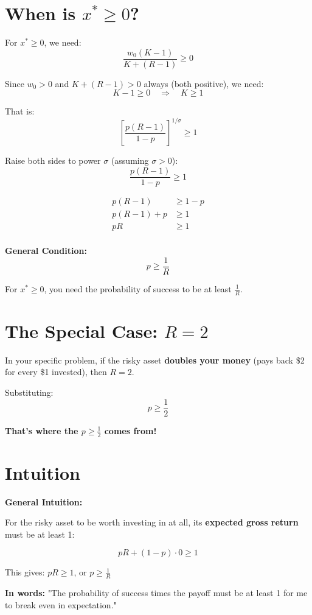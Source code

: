 \documentclass[12pt]{article}
\begin{document}
\section*{When is $x^* \geq 0$?}

For $x^* \geq 0$, we need:
\[
\frac{w_0(K - 1)}{K + (R-1)} \geq 0
\]

Since $w_0 > 0$ and $K + (R-1) > 0$ always (both positive), we need:
\[
K - 1 \geq 0 \quad \Rightarrow \quad K \geq 1
\]

That is:
\[
\left[\frac{p(R-1)}{1-p}\right]^{1/\sigma} \geq 1
\]

Raise both sides to power $\sigma$ (assuming $\sigma > 0$):
\[
\frac{p(R-1)}{1-p} \geq 1
\]

\begin{align*}
p(R-1) &\geq 1-p \\
p(R-1) + p &\geq 1 \\
pR &\geq 1 \\
\end{align*}

\begin{tcolorbox}[colback=green!5!white,colframe=green!75!black]
\textbf{General Condition:}
\[
\boxed{p \geq \frac{1}{R}}
\]

For $x^* \geq 0$, you need the probability of success to be at least $\frac{1}{R}$.
\end{tcolorbox}

\newpage

\section*{The Special Case: $R = 2$}

In your specific problem, if the risky asset \textbf{doubles your money} (pays back \$2 for every \$1 invested), then $R = 2$.

Substituting:
\[
p \geq \frac{1}{2}
\]

\textbf{That's where the $p \geq \frac{1}{2}$ comes from!}

\section*{Intuition}

\begin{tcolorbox}[colback=blue!5!white,colframe=blue!75!black]
\textbf{General Intuition:}

For the risky asset to be worth investing in at all, its \textbf{expected gross return} must be at least 1:

\[
pR + (1-p) \cdot 0 \geq 1
\]

This gives: $pR \geq 1$, or $p \geq \frac{1}{R}$

\vspace{0.3cm}

\textbf{In words:} "The probability of success times the payoff must be at least 1 for me to break even in expectation."
\end{tcolorbox}
\end{document}
